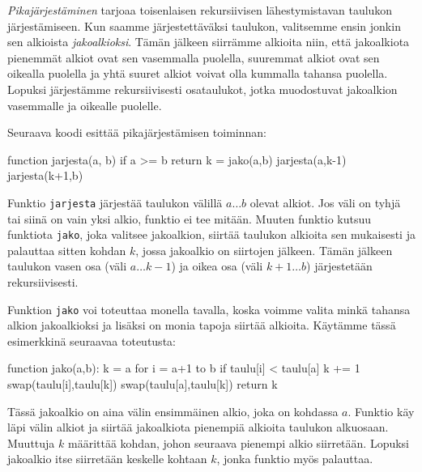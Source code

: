 \emph{Pikajärjestäminen} tarjoaa toisenlaisen rekursiivisen
lähestymistavan taulukon järjestämiseen.
Kun saamme järjestettäväksi taulukon, valitsemme ensin jonkin
sen alkioista \emph{jakoalkioksi}.
Tämän jälkeen siirrämme alkioita niin,
että jakoalkiota pienemmät alkiot ovat sen vasemmalla puolella,
suuremmat alkiot ovat sen oikealla puolella ja
yhtä suuret alkiot voivat olla kummalla tahansa puolella.
Lopuksi järjestämme rekursiivisesti osataulukot,
jotka muodostuvat jakoalkion vasemmalle ja oikealle puolelle.

Seuraava koodi esittää pikajärjestämisen toiminnan:

\begin{code}
function jarjesta(a, b)
    if a >= b
        return
    k = jako(a,b)
    jarjesta(a,k-1)
    jarjesta(k+1,b)
\end{code}

Funktio \texttt{jarjesta} järjestää taulukon välillä
$a \dots b$ olevat alkiot.
Jos väli on tyhjä tai siinä on vain yksi alkio,
funktio ei tee mitään.
Muuten funktio kutsuu funktiota \texttt{jako}, joka valitsee jakoalkion,
siirtää taulukon alkioita sen mukaisesti
ja palauttaa sitten kohdan $k$,
jossa jakoalkio on siirtojen jälkeen.
Tämän jälkeen taulukon vasen osa (väli $a \dots k-1$)
ja oikea osa (väli $k+1 \dots b$) järjestetään rekursiivisesti.

Funktion \texttt{jako} voi toteuttaa monella tavalla,
koska voimme valita minkä tahansa alkion jakoalkioksi ja
lisäksi on monia tapoja siirtää alkioita.
Käy\-tämme tässä esimerkkinä seuraavaa toteutusta:

\begin{code}
function jako(a,b):
    k = a
    for i = a+1 to b
        if taulu[i] < taulu[a]
            k += 1
            swap(taulu[i],taulu[k])
    swap(taulu[a],taulu[k])
    return k
\end{code}

Tässä jakoalkio on aina välin ensimmäinen alkio,
joka on kohdassa $a$.
Funktio käy läpi välin alkiot ja siirtää
jakoalkiota pienempiä alkioita taulukon alkuosaan.
Muuttuja $k$ määrittää kohdan,
johon seuraava pienempi alkio siirretään.
Lopuksi jakoalkio itse siirretään keskelle
kohtaan $k$, jonka funktio myös palauttaa.

